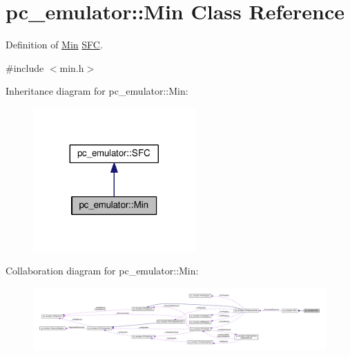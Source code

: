 \hypertarget{classpc__emulator_1_1Min}{}\section{pc\+\_\+emulator\+:\+:Min Class Reference}
\label{classpc__emulator_1_1Min}


Definition of \hyperlink{classpc__emulator_1_1Min}{Min} \hyperlink{classpc__emulator_1_1SFC}{S\+FC}.  




{\ttfamily \#include $<$min.\+h$>$}



Inheritance diagram for pc\+\_\+emulator\+:\+:Min\+:
\nopagebreak
\begin{figure}[H]
\begin{center}
\leavevmode
\includegraphics[width=176pt]{classpc__emulator_1_1Min__inherit__graph}
\end{center}
\end{figure}


Collaboration diagram for pc\+\_\+emulator\+:\+:Min\+:
\nopagebreak
\begin{figure}[H]
\begin{center}
\leavevmode
\includegraphics[width=350pt]{classpc__emulator_1_1Min__coll__graph}
\end{center}
\end{figure}
